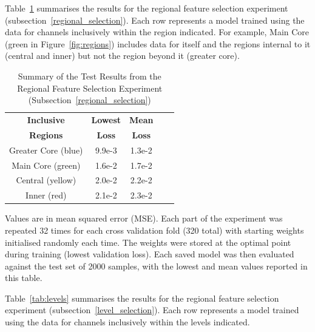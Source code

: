 \noindent
Table~\ref{tab:regional} summarises the results for the regional feature selection experiment (subsection~\ref{regional_selection}). Each row represents a model trained using the data for channels inclusively within the region indicated. For example, Main Core (green in Figure~\ref{fig:regions}) includes data for itself and the regions internal to it (central and inner) but not the region beyond it (greater core). 
\\

\begin{table}[h!]
	\begin{center}
		
		\begin{tabular}{c|c|c|r|c} %
			\textbf{Inclusive} & \textbf{Lowest} & \textbf{Mean} \\
			
			\textbf{Regions} & \textbf{Loss} & \textbf{Loss} \\
			\hline
			Greater Core (blue) & 9.9e-3  & 1.3e-2 \\
			Main Core (green) & 1.6e-2 & 1.7e-2 \\
			Central (yellow) & 2.0e-2 & 2.2e-2  \\
			Inner (red) & 2.1e-2 & 2.3e-2  \\
		\end{tabular}
		\caption{Summary of the Test Results from the Regional Feature Selection Experiment (Subsection~\ref{regional_selection})} {Values are in mean squared error (MSE). Each part of the experiment was repeated 32 times for each cross validation fold (320 total) with starting weights initialised randomly each time. The weights were stored at the optimal point during training (lowest validation loss). Each saved model was then evaluated against the test set of 2000 samples, with the lowest and mean values reported in this table.}
		\label{tab:regional}
	\end{center}
\end{table}

\noindent
Table~\ref{tab:levels} summarises the results for the regional feature selection experiment (subsection~\ref{level_selection}). Each row represents a model trained using the data for channels inclusively within the levels indicated.
\\

